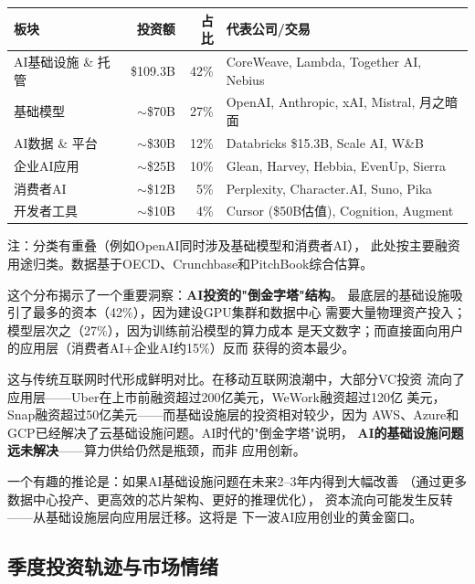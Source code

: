 \begin{keybox}
\small
\begin{tabularx}{\textwidth}{l r r X}
\toprule
\rowcolor{figLightGray}
\textbf{板块} & \textbf{投资额} & \textbf{占比}
  & \textbf{代表公司/交易} \\
\midrule
AI基础设施 \& 托管  & \$109.3B & 42\%
  & CoreWeave, Lambda, Together AI, Nebius \\
基础模型              & $\sim$\$70B  & 27\%
  & OpenAI, Anthropic, xAI, Mistral, 月之暗面 \\
AI数据 \& 平台       & $\sim$\$30B  & 12\%
  & Databricks \$15.3B, Scale AI, W\&B \\
企业AI应用            & $\sim$\$25B  & 10\%
  & Glean, Harvey, Hebbia, EvenUp, Sierra \\
消费者AI              & $\sim$\$12B  & 5\%
  & Perplexity, Character.AI, Suno, Pika \\
开发者工具            & $\sim$\$10B  & 4\%
  & Cursor (\$50B估值), Cognition, Augment \\
\bottomrule
\end{tabularx}

\medskip
\noindent 注：分类有重叠（例如OpenAI同时涉及基础模型和消费者AI），
此处按主要融资用途归类。数据基于OECD、Crunchbase和PitchBook综合估算。
\end{keybox}

这个分布揭示了一个重要洞察：\textbf{AI投资的"倒金字塔"结构}。
最底层的基础设施吸引了最多的资本（42\%），因为建设GPU集群和数据中心
需要大量物理资产投入；模型层次之（27\%），因为训练前沿模型的算力成本
是天文数字；而直接面向用户的应用层（消费者AI+企业AI约15\%）反而
获得的资本最少。

这与传统互联网时代形成鲜明对比。在移动互联网浪潮中，大部分VC投资
流向了应用层——Uber在上市前融资超过200亿美元，WeWork融资超过120亿
美元，Snap融资超过50亿美元——而基础设施层的投资相对较少，因为
AWS、Azure和GCP已经解决了云基础设施问题。AI时代的"倒金字塔"说明，
\textbf{AI的基础设施问题远未解决}——算力供给仍然是瓶颈，而非
应用创新。

一个有趣的推论是：如果AI基础设施问题在未来2--3年内得到大幅改善
（通过更多数据中心投产、更高效的芯片架构、更好的推理优化），
资本流向可能发生反转——从基础设施层向应用层迁移。这将是
下一波AI应用创业的黄金窗口。

\subsection{季度投资轨迹与市场情绪}
\label{subsec:fund-quarterly}

